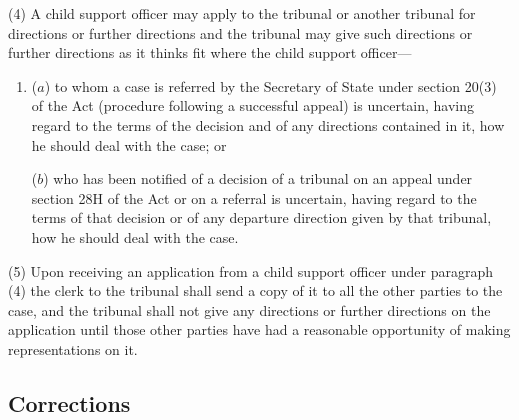 \documentclass[12pt,a4paper]{article}
\begin{document}

(4) A child support officer may apply to the tribunal or another tribunal for directions or further directions and the tribunal may give such directions or further directions as it thinks fit where the child support officer—
\begin{enumerate}\item[]
($a$) to whom a case is referred by the Secretary of State under section 20(3) of the Act (procedure following a successful appeal) is uncertain, having regard to the terms of the decision and of any directions contained in it, how he should deal with the case; or

($b$) who has been notified of a decision of a tribunal on an appeal under section 28H of the Act or on a referral is uncertain, having regard to the terms of that decision or of any departure direction given by that tribunal, how he should deal with the case.
\end{enumerate}

(5) Upon receiving an application from a child support officer under paragraph (4) the clerk to the tribunal shall send a copy of it to all the other parties to the case, and the tribunal shall not give any directions or further directions on the application until those other parties have had a reasonable opportunity of making representations on it.


\subsection[14. Corrections]{Corrections}
\end{document}
